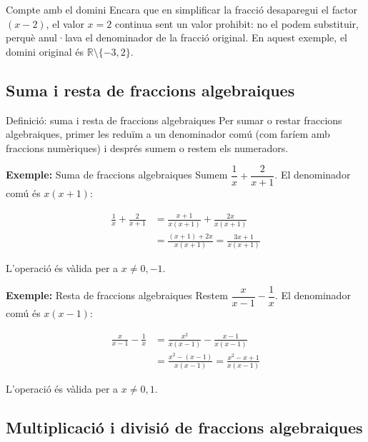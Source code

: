 \begin{nota}{Compte amb el domini}
Encara que en simplificar la fracció desaparegui el factor $(x-2)$, el valor $x=2$ continua sent un valor prohibit: no el podem substituir, perquè anul·lava el denominador de la fracció original. En aquest exemple, el domini original és $\mathbb{R}\setminus\{-3,2\}$.
\end{nota}

\subsection{Suma i resta de fraccions algebraiques}

\begin{definicio}{Definició: suma i resta de fraccions algebraiques}
Per sumar o restar fraccions algebraiques, primer les reduïm a un denominador comú (com faríem amb fraccions numèriques) i després sumem o restem els numeradors.
\end{definicio}

\begin{exemple}{\textbf{Exemple:} Suma de fraccions algebraiques}
Sumem $\dfrac{1}{x} + \dfrac{2}{x+1}$. El denominador comú és $x(x+1)$:

\[
\begin{aligned}
\frac{1}{x} + \frac{2}{x+1} &= \frac{x+1}{x(x+1)} + \frac{2x}{x(x+1)} \\
&= \frac{(x+1)+2x}{x(x+1)} = \frac{3x+1}{x(x+1)}
\end{aligned}
\]

L'operació és vàlida per a $x\neq0,-1$.
\end{exemple}

\begin{exemple}{\textbf{Exemple:} Resta de fraccions algebraiques}
Restem $\dfrac{x}{x-1} - \dfrac{1}{x}$. El denominador comú és $x(x-1)$:

\[
\begin{aligned}
\frac{x}{x-1} - \frac{1}{x} &= \frac{x^2}{x(x-1)} - \frac{x-1}{x(x-1)} \\
&= \frac{x^2-(x-1)}{x(x-1)} = \frac{x^2-x+1}{x(x-1)}
\end{aligned}
\]

L'operació és vàlida per a $x\neq0,1$.
\end{exemple}

\subsection{Multiplicació i divisió de fraccions algebraiques}


